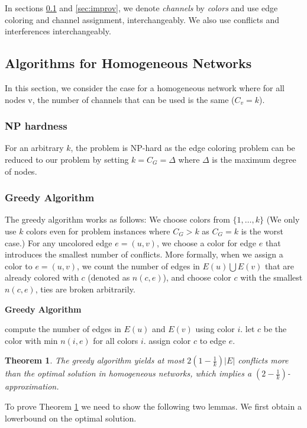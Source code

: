 \documentclass[titlepage, 11pt]{article}
\newtheorem{theorem}{Theorem}
\begin{document}
In sections \ref{sec:hom} and \ref{sec:improv}, we denote {\em channels} by {\em
colors} and use edge coloring and channel assignment, interchangeably.
We also use conflicts and interferences interchangeably.


\subsection{Algorithms for Homogeneous Networks}
\label{sec:hom}

In this section, we consider the case for a homogeneous network where for all nodes v, the number of channels that can be used is the same ($C_v = k$). 
\subsubsection{NP hardness}
\label{sec:np}
For an arbitrary $k$, the problem is NP-hard as the edge coloring problem can be reduced to our problem by setting $k = C_G = \Delta$ where $\Delta$ is the maximum degree of nodes.


\subsubsection{Greedy Algorithm} 
\label{sec:greedy}
The greedy algorithm works as follows:
We choose colors from $\{1, \dots, k\}$ 
(We only use $k$ colors even for problem instances where $C_G > k$ as $C_G = k$ is the worst case.) For any  uncolored edge $e = (u, v)$,
we choose a color for edge $e$ that introduces 
the smallest number of conflicts.
More formally, when we assign a color to $e = (u, v)$,
we count the number of edges in $E(u) \bigcup E(v)$
that are already colored with $c$ (denoted as $n(c, e)$),
and choose color $c$ with the smallest $n(c, e)$, ties are broken arbitrarily. 

\begin{algorithm}[h]
\caption{\bf  Greedy Algorithm}
\label{dgreedy}
\begin{algorithmic}
	\STATE compute the number of edges in $E(u)$ and $E(v)$ using color $i$.
	\ENDFOR
	\STATE let $c$ be the color with min $n(i, e)$ for all colors $i$.
	\STATE assign color $c$ to edge $e$.

\ENDFOR
\end{algorithmic}
\end{algorithm}

\begin{theorem}
\label{th:onehop-greedy}
The greedy algorithm yields at most  $2(1 -\frac{1}{k})|E|$ conflicts more than the optimal solution
in homogeneous networks, which implies  a  $(2 - \frac{1}{k})$-approximation.
\end{theorem}
To prove Theorem \ref{th:onehop-greedy} we need to show the following two lemmas. We first obtain a lowerbound on the optimal solution.
\end{document}
